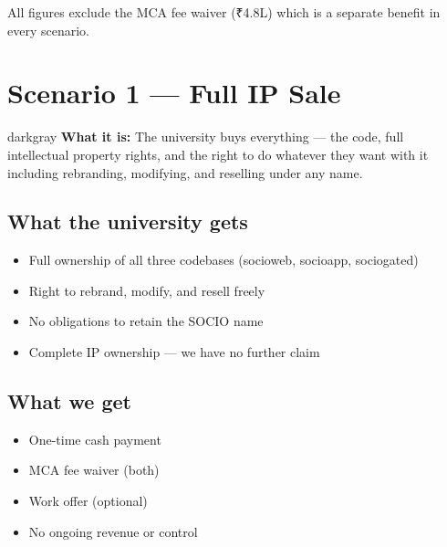 \documentclass[12pt,a4paper]{article}
\begin{document}
    \vspace{0.3cm}
    {\small\color{darkgray} All figures exclude the MCA fee waiver (₹4.8L) which is a separate benefit in every scenario.}

    \newpage
    \tableofcontents
    \newpage

    \section{Scenario 1 — Full IP Sale}

    \begin{scenariobox}{darkgray}
    \textbf{What it is:} The university buys everything — the code, full intellectual property rights, and the right to do whatever they want with it including rebranding, modifying, and reselling under any name.
    \end{scenariobox}

    \vspace{0.4cm}

    \subsection*{What the university gets}
    \begin{itemize}[leftmargin=*, noitemsep]
        \item Full ownership of all three codebases (socioweb, socioapp, sociogated)
        \item Right to rebrand, modify, and resell freely
        \item No obligations to retain the SOCIO name
        \item Complete IP ownership — we have no further claim
    \end{itemize}

    \subsection*{What we get}
    \begin{itemize}[leftmargin=*, noitemsep]
        \item One-time cash payment
        \item MCA fee waiver (both)
        \item Work offer (optional)
        \item No ongoing revenue or control
    \end{itemize}
\end{document}
